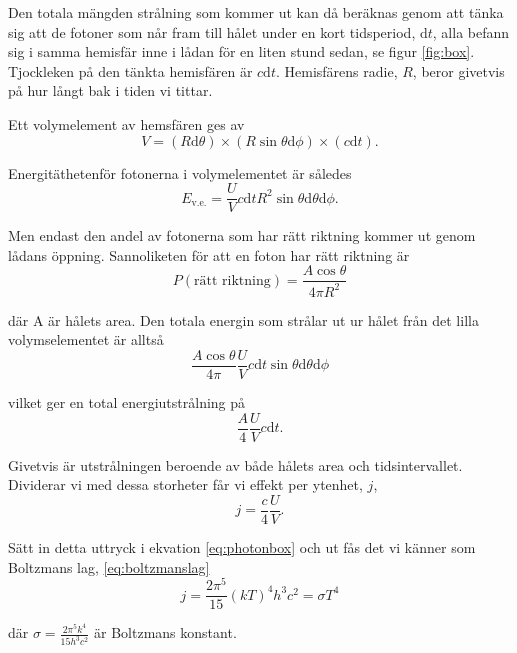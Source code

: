 Den totala mängden strålning som kommer ut kan då beräknas genom att tänka sig att 
de fotoner som når fram till hålet under en kort tidsperiod, $\mathrm{d}t$, alla befann sig
 i samma hemisfär inne i lådan för en liten stund sedan, se figur \ref{fig:box}. Tjockleken 
 på den tänkta hemisfären är $c\mathrm{d}t$. Hemisfärens radie, $R$, beror givetvis på 
 hur långt bak i tiden vi tittar.

Ett volymelement av hemsfären ges av
\begin{equation}
V=(R\mathrm{d}\theta) \times (R\sin\theta\mathrm{d}\phi) \times (c \mathrm{d}t).
\end{equation}

Energitäthetenför fotonerna i volymelementet är således
\begin{equation}
E_\text{v.e.}=\frac{U}{V} c \mathrm{d}t R^2 \sin\theta \mathrm{d}\theta \mathrm{d}\phi.
\end{equation}

Men endast den andel av fotonerna som har rätt riktning kommer ut genom lådans öppning. Sannoliketen för att en foton har rätt riktning är
\begin{equation}
P(\text{rätt riktning})=\frac{A\cos\theta}{4\pi R^2}
\end{equation}

där A är hålets area. Den totala energin som strålar ut ur hålet från det lilla 
volymselementet är alltså 
\begin{equation}
\frac{A\cos\theta}{4\pi}\frac{U}{V} c\mathrm{d}t \sin\theta\mathrm{d}\theta \mathrm{d}\phi
\end{equation}

vilket ger en total energiutstrålning på
\begin{equation}
\frac{A}{4}\frac{U}{V}c \mathrm{d}t.
\end{equation}

Givetvis är utstrålningen beroende av både hålets area och tidsintervallet. Dividerar vi med dessa storheter får vi effekt per ytenhet, $j$,
\begin{equation}
j=\frac{c}{4}\frac{U}{V}. 
\end{equation}

Sätt in detta uttryck i ekvation \eqref{eq:photonbox} och ut fås det vi känner som Boltzmans lag, \eqref{eq:boltzmanslag}
\begin{equation}
j=\frac{2\pi^5}{15}{(kT)^4}{h^3c^2}=\sigma T^4
\end{equation}

där $\sigma=\frac{2\pi^5k^4}{15h^3c^2}$ är Boltzmans konstant.


